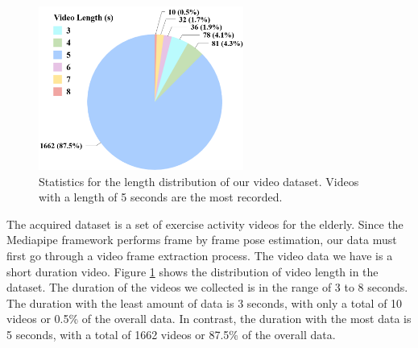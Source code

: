 \begin{figure}[h!]
	\centering
	\includegraphics[width=0.6\textwidth]{bab4/ar_VideoLength.png}
	\caption{Statistics for the length distribution of our video dataset. Videos with a length of 5 seconds are the most recorded.}
	\label{fig:VideoLengthDistribution}
\end{figure}

The acquired dataset is a set of exercise activity videos for the elderly. Since the Mediapipe framework performs frame by frame pose estimation, our data must first go through a video frame extraction process. The video data we have is a short duration video. Figure \ref{fig:VideoLengthDistribution} shows the distribution of video length in the dataset. The duration of the videos we collected is in the range of 3 to 8 seconds. The duration with the least amount of data is 3 seconds, with only a total of 10 videos or 0.5\% of the overall data. In contrast, the duration with the most data is 5 seconds, with a total of 1662 videos or 87.5\% of the overall data.

